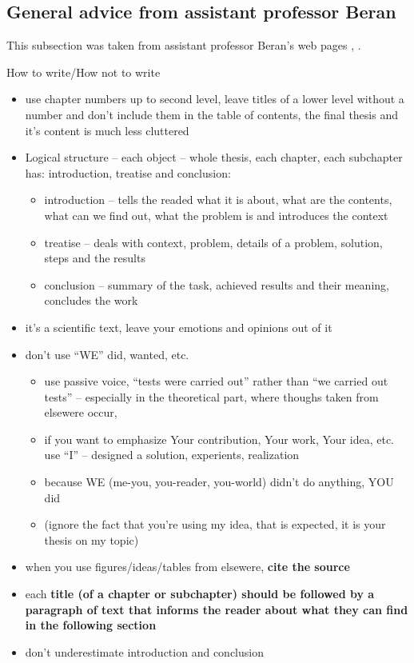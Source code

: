 {{\subsection*{General advice from assistant professor Beran}

This subsection was taken from assistant professor Beran's web pages \cite{Beran}, \cite{BeranPDF}.

How to write/How not to write
\begin{itemize}
  \item{use chapter numbers up to second level, leave titles of a lower level without a number and don't include them in the table of contents, the final thesis and it's content is much less cluttered}
  \item{Logical structure -- each object -- whole thesis, each chapter, each subchapter has: introduction, treatise and conclusion:
  	\begin{itemize}
  		\item{introduction -- tells the readed what it is about, what are the contents, what can we find out, what the problem is and introduces the context}
  		\item{treatise -- deals with context, problem, details of a problem, solution, steps and the results}
  		\item{conclusion -- summary of the task, achieved results and their meaning, concludes the work}
  	\end{itemize}
  }
  \item{it's a scientific text, leave your emotions and opinions out of it}
  \item{don't use ``WE'' did, wanted, etc.
    \begin{itemize}
      \item{use passive voice, ``tests were carried out'' rather than ``we carried out tests'' -- especially in the theoretical part, where thoughs taken from elsewere occur,}
      \item{if you want to emphasize Your contribution, Your work, Your idea, etc. use ``I'' -- designed a solution, experients, realization}
      \item{because WE (me-you, you-reader, you-world) didn't do anything, YOU did}
      \item{(ignore the fact that you're using my idea, that is expected, it is your thesis on my topic)}
    \end{itemize}}
  \item{when you use figures/ideas/tables from elsewere, \bf cite the source \rm}
  \item{each \bf title \rm (of a chapter or subchapter) should be followed by a paragraph of text that informs the reader about what they can find in the following section}
  \item{don't underestimate introduction and conclusion}
\end{itemize}


}}
